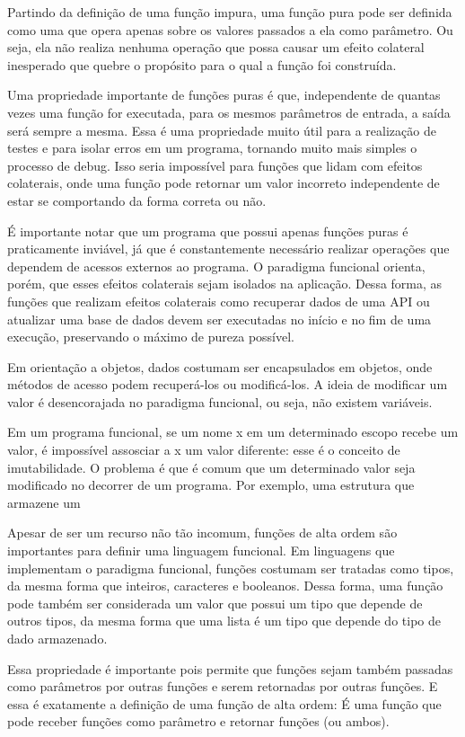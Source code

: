 Partindo da definição de uma função impura, uma função pura 
pode ser definida como uma que opera apenas sobre os valores 
passados a ela como parâmetro. Ou seja, ela não realiza 
nenhuma operação que possa causar um efeito colateral 
inesperado que quebre o propósito para o qual a função foi 
construída.

Uma propriedade importante de funções puras é que, 
independente de quantas vezes uma função for executada, 
para os mesmos parâmetros de entrada, a saída será sempre 
a mesma. Essa é uma propriedade muito útil para a realização 
de testes e para isolar erros em um programa, tornando muito 
mais simples o processo de debug. Isso seria impossível para 
funções que lidam com efeitos colaterais, onde uma função 
pode retornar um valor incorreto independente de estar se 
comportando da forma correta ou não.

É importante notar que um programa que possui apenas funções 
puras é praticamente inviável, já que é constantemente 
necessário realizar operações que dependem de acessos 
externos ao programa. O paradigma funcional orienta, porém, 
que esses efeitos colaterais sejam isolados na aplicação. 
Dessa forma, as funções que realizam efeitos colaterais como 
recuperar dados de uma API ou atualizar uma base de dados 
devem ser executadas no início e no fim de uma execução, 
preservando o máximo de pureza possível.


Em orientação a objetos, dados costumam ser encapsulados em 
objetos, onde métodos de acesso podem recuperá-los ou 
modificá-los. A ideia de modificar um valor é desencorajada 
no paradigma funcional, ou seja, não existem variáveis.

Em um programa funcional, se um nome x em um determinado 
escopo recebe um valor, é impossível assosciar a x um 
valor diferente: esse é o conceito de imutabilidade. O 
problema é que é comum que um determinado valor seja 
modificado no decorrer de um programa. Por exemplo, uma 
estrutura que armazene um 


Apesar de ser um recurso não tão incomum, funções de alta 
ordem são importantes para definir uma linguagem funcional. 
Em linguagens que implementam o paradigma funcional, funções 
costumam ser tratadas como tipos, da mesma forma que inteiros, 
caracteres e booleanos. Dessa forma, uma função pode também 
ser considerada um valor que possui um tipo que depende de 
outros tipos, da mesma forma que uma lista é um tipo que 
depende do tipo de dado armazenado.

Essa propriedade é importante pois permite que funções 
sejam também passadas como parâmetros por outras funções e 
serem retornadas por outras funções. E essa é exatamente a 
definição de uma função de alta ordem: É uma função que 
pode receber funções como parâmetro e retornar funções (ou 
ambos).


